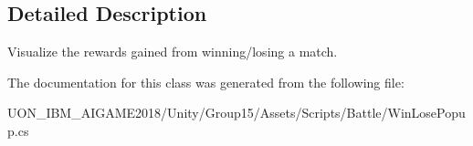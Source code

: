 \subsection{Detailed Description}
Visualize the rewards gained from winning/losing a match. 

The documentation for this class was generated from the following file\+:\begin{DoxyCompactItemize}
\item 
U\+O\+N\+\_\+\+I\+B\+M\+\_\+\+A\+I\+G\+A\+M\+E2018/\+Unity/\+Group15/\+Assets/\+Scripts/\+Battle/Win\+Lose\+Popup.\+cs\end{DoxyCompactItemize}
